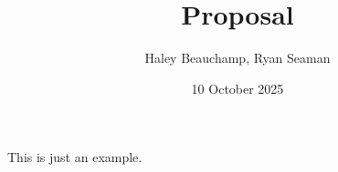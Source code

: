 \documentclass{homework}
\author{Haley Beauchamp, Ryan Seaman}
\date{10 October 2025}
\title{Proposal}
\begin{document}
 \maketitle

This is just an example.

% 
% 
\end{document}
